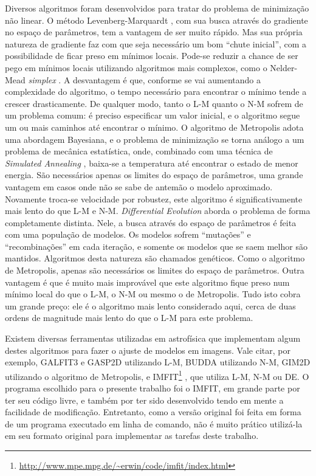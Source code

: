 Diversos algoritmos foram desenvolvidos para tratar do problema de minimização
não linear. O método Levenberg-Marquardt \citep[daqui em diante
L-M]{Levenberg1944, Marquardt1963}, com sua busca através do gradiente no espaço
de parâmetros, tem a vantagem de ser muito rápido. Mas sua própria natureza de
gradiente faz com que seja necessário um bom ``chute inicial'', com a
possibilidade de ficar preso em mínimos locais. Pode-se reduzir a chance de ser
pego em mínimos locais utilizando algoritmos mais complexos, como o Nelder-Mead
{\em simplex} \citep[daqui em diante N-M]{Nelder1965}. A desvantagem é que,
conforme se vai aumentando a complexidade do algoritmo, o tempo necessário para
encontrar o mínimo tende a crescer drasticamente. De qualquer modo, tanto o L-M
quanto o N-M sofrem de um problema comum: é preciso especificar um valor
inicial, e o algoritmo segue um ou mais caminhos até encontrar o mínimo. O
algoritmo de Metropolis \citep{Metropolis1953, Saha1994} adota uma abordagem
Bayesiana, e o problema de minimização se torna análogo a um problema de
mecânica estatística, onde, combinado com uma técnica de {\em Simulated
Annealing} \citep{Kirkpatrick1983}, baixa-se a temperatura até encontrar o
estado de menor energia. São necessários apenas os limites do espaço de
parâmetros, uma grande vantagem em casos onde não se sabe de antemão o modelo
aproximado. Novamente troca-se velocidade por robustez, este algoritmo é
significativamente mais lento do que L-M e N-M. {\em Differential Evolution}
\citep[daqui em diante DE]{Storn1997} aborda o problema de forma completamente
distinta. Nele, a busca através do espaço de parâmetros é feita com uma
população de modelos. Os modelos sofrem ``mutações'' e ``recombinações'' em cada
iteração, e somente os modelos que se saem melhor são mantidos. Algoritmos desta
natureza são chamados genéticos. Como o algoritmo de Metropolis, apenas são
necessários os limites do espaço de parâmetros. Outra vantagem é que é muito
mais improvável que este algoritmo fique preso num mínimo local do que o L-M, o
N-M ou mesmo o de Metropolis. Tudo isto cobra um grande preço: ele é o algoritmo
mais lento considerado aqui, cerca de duas ordens de magnitude mais lento do que
o L-M para este problema.

Existem diversas ferramentas utilizadas em astrofísica que implementam algum
destes algoritmos para fazer o ajuste de modelos em imagens. Vale citar, por
exemplo, GALFIT3 \citep{Peng2010} e GASP2D \citep{MendezAbreu2008} utilizando
L-M, BUDDA \citep{DeSouza2004} utilizando N-M, GIM2D \citep{Simard2002}
utilizando o algoritmo de Metropolis, e
IMFIT\footnote{\url{http://www.mpe.mpg.de/~erwin/code/imfit/index.html}}
\citet{Erwin2015}, que utiliza L-M, N-M ou DE. O programa escolhido para o
presente trabalho foi o IMFIT, em grande parte por ter seu código livre, e
também por ter sido desenvolvido tendo em mente a facilidade de modificação.
Entretanto, como a versão original foi feita em forma de um programa executado
em linha de comando, não é muito prático utilizá-la em seu formato original para
implementar as tarefas deste trabalho.

